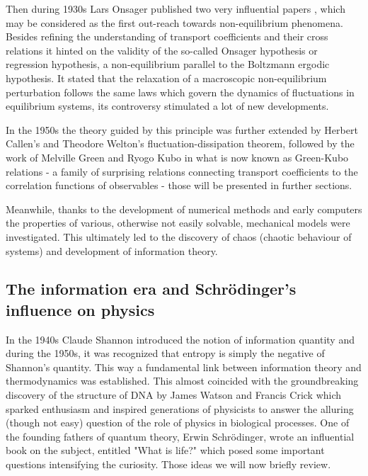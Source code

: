 \documentclass[a4paper,12pt]{article}
\begin{document}
Then during 1930s Lars Onsager published two very influential papers \cite{Onsager:zgWBDrcO, Onsager:sJs1Kffm}, which may be considered as the first out-reach towards non-equilibrium phenomena.
Besides refining the understanding of transport coefficients and their cross relations it hinted on the validity of the so-called Onsager hypothesis or regression hypothesis, a non-equilibrium parallel to the Boltzmann ergodic hypothesis. It stated that the relaxation of a macroscopic non-equilibrium perturbation follows the same laws which govern the dynamics of fluctuations in equilibrium systems, its controversy stimulated a lot of new developments.

In the 1950s the theory guided by this principle was further extended by  Herbert Callen's and Theodore Welton's fluctuation-dissipation theorem, followed by the work of Melville Green and Ryogo Kubo in what is now known as Green-Kubo relations \cite{Kubo:1957cl} - a family of surprising relations connecting transport coefficients to the correlation functions of observables - those will be presented in further sections. 

Meanwhile, thanks to the development of numerical methods and early computers the properties of various, otherwise not easily solvable, mechanical models were investigated.
This ultimately led to the discovery of chaos (chaotic behaviour of systems) and development of information theory.

\subsection{The information era and Schrödinger's influence on physics}
\label{SchrodingersInfluence}

In the 1940s Claude Shannon introduced the notion of information quantity \cite{Shannon:429164} and during the 1950s, it was recognized that entropy is simply the negative of Shannon's quantity. This way a fundamental link between information theory and thermodynamics was established. This almost coincided with the groundbreaking discovery of the structure of DNA by James Watson and Francis Crick which sparked enthusiasm and inspired generations of physicists to answer the alluring (though not easy) question of the role of physics in biological processes.
One of the founding fathers of quantum theory, Erwin Schrödinger, wrote an influential book on the subject, entitled "What is life?" \cite{Schrodinger:2005wk} which  posed some important questions intensifying the curiosity. Those ideas we will now briefly review.
\end{document}

